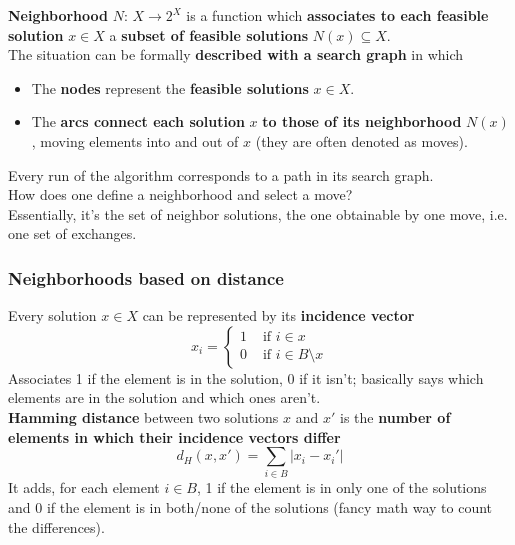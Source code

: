 \textbf{Neighborhood} $N : \, X \rightarrow 2^X$ is a function which \textbf{associates to each feasible solution} $x \in X$ a \textbf{subset of feasible solutions} $N (x) \subseteq X$.\\

The situation can be formally \textbf{described with a search graph} in which
\begin{itemize}
	\item The \textbf{nodes} represent the \textbf{feasible solutions} $x \in X$.\\
	
	\item The \textbf{arcs connect each solution} $x$ \textbf{to those of its neighborhood} $N (x)$, moving elements into and out of $x$ (they are often denoted as moves).\\
\end{itemize}

Every run of the algorithm corresponds to a path in its search graph.\\

How does one define a neighborhood and select a move? \\

Essentially, it's the set of neighbor solutions, the one obtainable by one move, i.e. one set of exchanges.\\

\newpage

\subsubsection{Neighborhoods based on distance}

Every solution $x \in X$ can be represented by its \textbf{incidence vector}
$$ x_i = \begin{cases}
	1 & \text{ if } i \in x \\
	0 & \text{ if } i \in B \setminus x
\end{cases}$$
Associates 1 if the element is in the solution, 0 if it isn't; basically says which elements are in the solution and which ones aren't.\\

\textbf{Hamming distance} between two solutions $x$ and $x'$  is the \textbf{number of elements in which their incidence vectors differ}
$$ d_H (x, x') = \sum_{i \in B} |x_i - x_i'|$$
It adds, for each element $i \in B$, 1 if the element is in only one of the solutions and 0 if the element is in both/none of the solutions (fancy math way to count the differences).\\

